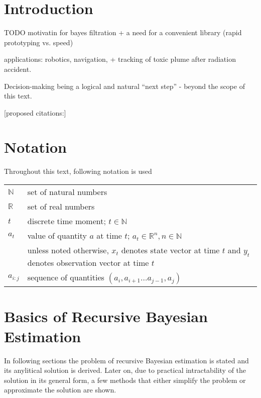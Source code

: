 \documentclass[a4paper,12pt,oneside]{report}
\newif\ifrelease %
\begin{document}
\ifrelease
\fi


\newpage
\tableofcontents


\chapter*{Introduction} 

TODO motivatin for bayes filtration + a need for a convenient library (rapid prototyping vs. speed)

applications: robotics, navigation, + tracking of toxic plume after radiation accident.

Decision-making being a logical and natural ``next step'' - beyond the scope of this text.

[proposed citations:\cite{ThrBurFox:05,Gus:02,HofSmi:09,HofSmiPech:09,PechHofSmi:09}]


\chapter*{Notation} 

Throughout this text, following notation is used

\bigskip

\begin{tabular}{l p{}}
	\(\mathbb{N}\) & set of natural numbers \\
	\(\mathbb{R}\) & set of real numbers \\
	\(t\) & discrete time moment; \(t \in \mathbb{N}\) \\
	\(a_t\) & value of quantity \(a\) at time \(t\); \(a_t \in \mathbb{R}^n, n \in \mathbb{N}\) \\
		& unless noted otherwise, \(x_t\) denotes state vector at time \(t\) and \(y_t\) denotes
		  observation vector at time \(t\) \\
	\(a_{i:j}\) & sequence of quantities \((a_i, a_{i+1} \dots a_{j-1}, a_j)\) \\
\end{tabular}


\chapter{Basics of Recursive Bayesian Estimation}

In following sections the problem of recursive Bayesian estimation is stated and its anylitical
solution is derived. Later on, due to practical intractability of the solution in its general form,
a few methods that either simplify the problem or approximate the solution are shown.
\end{document}
